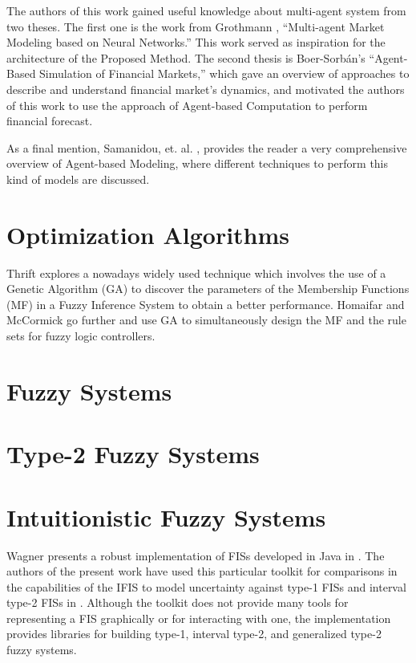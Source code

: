 The authors of this work gained useful knowledge about multi-agent system from two theses. The
first one is the work from Grothmann \cite{Grothmann2002}, ``Multi-agent Market
Modeling based on Neural Networks.'' This work served as inspiration for the
architecture of the Proposed Method. The second thesis is Boer-Sorb{\'{a}}n's
``Agent-Based Simulation of Financial Markets,'' which gave an overview of
approaches to describe and understand financial market's dynamics, and motivated
the authors of this work to use the approach of Agent-based Computation to
perform financial forecast.

As a final mention, Samanidou, et. al. \cite{Samanidou_2007}, provides the
reader a very comprehensive overview of Agent-based Modeling, where different
techniques to perform this kind of models are discussed.

\section{Optimization Algorithms}
\label{section:optimization-algorithms}

Thrift \cite{Thrift1991} explores a nowadays widely used technique which
involves the use of a Genetic Algorithm (GA) to discover the parameters of the
Membership Functions (MF) in a Fuzzy Inference System to obtain a better
performance. Homaifar and McCormick \cite{Homaifar1995} go further and use GA to
simultaneously design the MF and the rule sets for fuzzy logic controllers.

\section{Fuzzy Systems}
\label{section:fuzzy-systems}

\section{Type-2 Fuzzy Systems}
\label{section:type-2-fuzzy-systems}

\section{Intuitionistic Fuzzy Systems}
\label{section:related-work-intuitionistic-fuzzy-systems}

Wagner presents a robust implementation of FISs developed in Java in
\cite{Wagner2013}. The authors of the present work have used this particular
toolkit for comparisons in the capabilities of the IFIS to model uncertainty
against type-1 FISs and interval type-2 FISs in
\cite{Hernandez-Aguila2016}. Although the toolkit does not provide many tools
for representing a FIS graphically or for interacting with one, the
implementation provides libraries for building type-1, interval type-2, and
generalized type-2 fuzzy systems.

